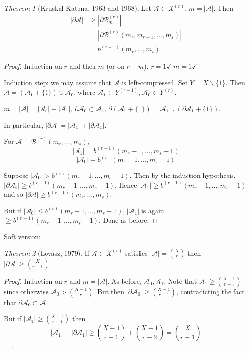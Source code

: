 \documentclass[a4paper]{article}
\theoremstyle{definition}
\theoremstyle{remark}
\theoremstyle{default}
\newtheorem{theorem}{Theorem}
\newcommand*\abs[1]{\left|#1\right|}
\begin{document}
\begin{theorem}[Kruskal-Katona, 1963 and 1968]
	Let $\mathcal{A} \subset X^{(r)}$, $m = \abs{\mathcal{A}}$. Then
	\begin{align*}
		\abs{\partial\mathcal{A}} &\geq \abs{\partial\mathcal{B}_m^{(r)}} \\
		&= \abs{\partial\mathcal{B}^{(r)}(m_r, m_{r-1}, \dots, m_s)} \\
			&= b^{(r-1)}(m_r, \dots, m_s)
	\end{align*}
\end{theorem}
\begin{proof}
	Induction on $r$ and then $m$ (or on $r+m$). $r=1 \checkmark \ m=1 \checkmark$
	
	Induction step: we may assume that $\mathcal{A}$ is left-compressed.
	Set $Y = X \backslash \{1\}$.
	Then $\mathcal{A} = (\mathcal{A}_1 + \{1\}) \cup \mathcal{A}_0$,
	where $\mathcal{A}_1 \subset Y^{(r-1)}$, $\mathcal{A}_0 \subset Y^{(r)}$.
	
	$m=\abs{\mathcal{A}} = \abs{\mathcal{A}_0} + \abs{\mathcal{A}_1}$, 
	$\partial \mathcal{A}_0 \subset \mathcal{A}_1$,
	$\partial(\mathcal{A}_1 + \{1\}) = \mathcal{A}_1 \cup (\partial\mathcal{A}_1 + \{1\})$.
	
	In particular,
	$\abs{\partial\mathcal{A}} = \abs{\mathcal{A}_1} + \abs{\partial\mathcal{A}_1}$.
	
	For $\mathcal{A} = \mathcal{B}^{(r)}(m_r, \dots, m_s)$, $$\abs{\mathcal{A}_1} = b^{(r-1)}(m_r-1,\dots,m_s-1)$$ $$\abs{\mathcal{A}_0} = b^{(r)}(m_r-1,\dots,m_s-1)$$
	
	Suppose $\abs{\mathcal{A}_0} > b^{(r)}(m_r-1,\dots,m_s-1)$.
	Then by the induction hypothesis,
	$\abs{\partial\mathcal{A}_0} \geq b^{(r-1)}(m_r-1,\dots,m_s-1)$.
	Hence $\abs{\mathcal{A}_1} \geq b^{(r-1)}(m_r-1, \dots, m_s-1)$
	and so $\abs{\partial \mathcal{A}} \geq b^{(r-1)}(m_r, \dots, m_s)$.
	
	But if $\abs{\mathcal{A}_0} \leq b^{(r)}(m_r-1, \dots, m_s-1)$,
	$\abs{\mathcal{A}_1}$ is again $\geq b^{(r-1)}(m_r-1,\dots,m_s-1)$.
	Done as before.
\end{proof}

Soft version:
\begin{theorem}[Lov\'asz, 1979]
	If $\mathcal{A} \subset X^{(r)}$ satisfies $\abs{\mathcal{A}} = {X \choose r}$ then $\abs{\partial\mathcal{A}} \geq {X \choose r-1}$.
\end{theorem}
\begin{proof}
	Induction on $r$ and $m = \abs{\mathcal{A}}$. As before, $\mathcal{A}_0, \mathcal{A}_1$.
	Note that $\mathcal{A}_1 \geq {X-1 \choose r-1}$ since otherwise $\mathcal{A}_0 > {X-1 \choose r}$.
	But then $\abs{\partial\mathcal{A}_0} \geq {X-1 \choose r-1}$,
	contradicting the fact that $\partial\mathcal{A}_0 \subset \mathcal{A}_1$.
	
	But if $\abs{\mathcal{A}_1} \geq {X-1 \choose r-1}$ then $$\abs{\mathcal{A}_1} + \abs{\partial\mathcal{A}_1} \geq {X-1 \choose r-1} + {X-1 \choose r-2} = {X \choose r-1}$$
\end{proof}
\end{document}

